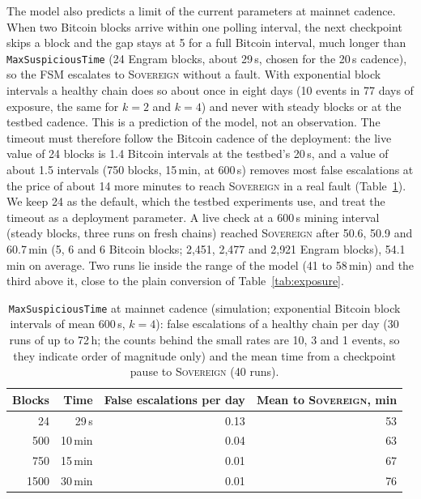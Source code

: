 The model also predicts a limit of the current parameters at mainnet cadence.
When two Bitcoin blocks arrive within one polling interval, the next checkpoint
skips a block and the gap stays at 5 for a full Bitcoin interval, much longer
than \texttt{MaxSuspiciousTime} (24 Engram blocks, about 29\,s, chosen for the
20\,s cadence), so the FSM escalates to \textsc{Sovereign} without a fault. With
exponential block intervals a healthy chain does so about once in eight days
(10 events in 77 days of exposure, the same for $k{=}2$ and $k{=}4$) and never
with steady blocks or at the testbed cadence. This is a prediction of the
model, not an observation. The timeout must therefore follow the Bitcoin
cadence of the deployment: the live value of 24 blocks is 1.4 Bitcoin intervals
at the testbed's 20\,s, and a value of about 1.5 intervals (750 blocks, 15\,min,
at 600\,s) removes most false escalations at the price of about 14 more minutes
to reach \textsc{Sovereign} in a real fault (Table~\ref{tab:mst}). We keep 24 as the
default, which the testbed experiments use, and treat the timeout as a deployment
parameter. A live check at a 600\,s mining interval (steady blocks, three runs on fresh chains) reached \textsc{Sovereign} after 50.6, 50.9 and 60.7\,min (5, 6 and 6 Bitcoin blocks; 2{,}451, 2{,}477 and 2{,}921 Engram blocks), 54.1\,min on average. Two runs lie inside the range of the model (41 to 58\,min) and the third above it, close to the plain conversion of Table~\ref{tab:exposure}.

\begin{table}[tbp]
\caption{\texttt{MaxSuspiciousTime} at mainnet cadence (simulation; exponential
Bitcoin block intervals of mean 600\,s, $k{=}4$): false escalations of a healthy
chain per day (30 runs of up to 72\,h; the counts behind the small rates are 10,
3 and 1 events, so they indicate order of magnitude only) and the mean time from
a checkpoint pause to \textsc{Sovereign} (40 runs).}
\label{tab:mst}
\centering
\footnotesize
\begin{tabular}{@{}rrrr@{}}
\toprule
\textbf{Blocks} & \textbf{Time} & \textbf{False escalations per day} & \textbf{Mean to \textsc{Sovereign}, min} \\
\midrule
24 & 29\,s & 0.13 & 53 \\
500 & 10\,min & 0.04 & 63 \\
750 & 15\,min & 0.01 & 67 \\
1500 & 30\,min & 0.01 & 76 \\
\bottomrule
\end{tabular}
\end{table}

